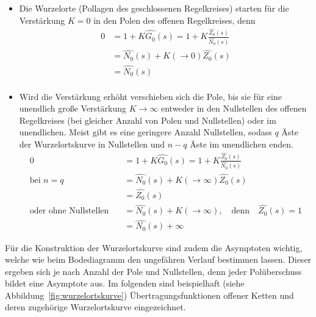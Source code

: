 \begin{itemize}
	\item Die Wurzelorte (Pollagen des geschlossenen Regelkreises) starten für die Verstärkung $K=0$ in den Polen des offenen Regelkreises, denn
	\begin{equation*}
	\begin{aligned}
	0&=1+K\hat{G_{0}}(s)=1+K\frac{\hat{Z_{0}}(s)}{\hat{N_{0}}(s)}\\
	&=\hat{N_{0}}(s)+K(\rightarrow 0)\hat{Z_{0}}(s)\\
	&=\hat{N_{0}}(s)\\
	\end{aligned}
	\end{equation*}
	\item Wird die Verstärkung erhöht verschieben sich die Pole, bis sie für eine unendlich große Verstärkung $K\rightarrow\infty$ entweder in den Nullstellen des offenen Regelkreises (bei gleicher Anzahl von Polen und Nullstellen) oder im unendlichen. Meist gibt es eine geringere Anzahl Nullstellen, sodass $q$ Äste der Wurzelortskurve in Nullstellen und $n-q$ Äste im unendlichen enden.
		\begin{equation*}
	\begin{aligned}
	0&=1+K\hat{G_{0}}(s)=1+K\frac{\hat{Z_{0}}(s)}{\hat{N_{0}}(s)}\\
	\text{bei}\,\, n=q \quad &=\hat{N_{0}}(s)+K(\rightarrow \infty)\hat{Z_{0}}(s)\\
	&=\hat{Z_{0}}(s)\\
	\text{oder ohne Nullstellen} \quad &=\hat{N_{0}}(s)+K(\rightarrow \infty), \quad \text{denn} \quad \hat{Z_{0}}(s)=1\\
	&=\hat{N_{0}}(s)+\infty
	\end{aligned}
	\end{equation*}
\end{itemize}
%
%
Für die Konstruktion der Wurzelortskurve sind zudem die Asymptoten wichtig, welche wie beim Bodediagramm den ungefähren Verlauf bestimmen lassen. Dieser ergeben sich je nach Anzahl der Pole und Nullstellen, denn jeder Polüberschuss bildet eine Asymptote aus. Im folgenden sind beispielhaft (siehe Abbildung~\ref{fig:wurzelortskurve}) Übertragungsfunktionen offener Ketten und deren zugehörige Wurzelortskurve eingezeichnet.
